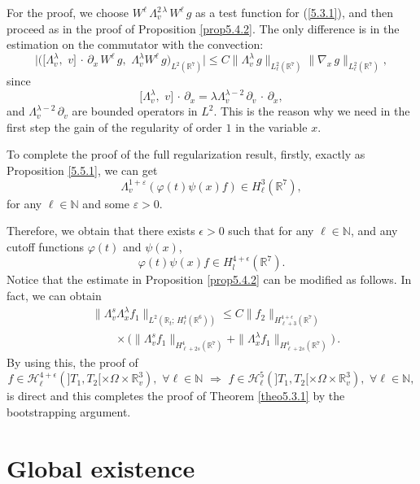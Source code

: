 \documentclass{amsart}[12pt, article]
\begin{document}
For the proof, we choose $W^{\ell}\,\Lambda^{2 \, \lambda}_v \, W^{\ell}\,g $ as a
test function for (\ref{5.3.1}), and then proceed as in the proof of Proposition \ref{prop5.4.2}. The only difference is in the
estimation on the  commutator with the convection:
$$
\Big|\Big( \big[\Lambda^{\lambda}_v, \,\, v\big]\,\cdot\,\partial_x
\, W^\ell\,g ,\,\,  \Lambda^{\lambda}_v W^\ell\,g\Big)_{L^2({{{\mathbb R}}}^7)}
\Big| \leq C
\|\Lambda^{\lambda}_{v}\,g\|_{L^2_\ell({{{\mathbb R}}}^7)}\|\nabla_x
\,g\|_{L^2_\ell({{{\mathbb R}}}^7)} ,
$$
since
$$
\big[\Lambda^{\lambda}_v, \,\, v\big]\,\cdot\,\partial_x =\lambda
\Lambda^{\lambda-2}_v \, \partial_v\,\cdot\,\partial_x,
$$
and $\Lambda^{\lambda-2}_v \, \partial_v$ are bounded operators in
$L^2$. This is the reason why we need in the first
step the gain of the regularity of order $1$ in the variable $x$.

To complete the proof of the full
regularization result, firstly, exactly as Proposition \ref{5.5.1}, we can get
\begin{equation*}
\Lambda^{1+\varepsilon}_{v} (\varphi(t)\psi(x) f)\in H^3_\ell
({{{\mathbb R}}}^7),
\end{equation*}
for any $\ell  \in{{\mathbb N}}$ and some $\varepsilon>0$.

Therefore, we obtain that there exists $\epsilon>0$ such
that for any $\ell\in{{\mathbb N}}$, and any cutoff functions $\varphi(t)$ and
$\psi(x)$,
$$
\varphi(t)\psi(x) f\in H^{4+\epsilon}_l({{{\mathbb R}}}^7).
$$
Notice that the estimate in Proposition \ref{prop5.4.2} can be
modified as follows. In fact, we can obtain
\begin{align*}
&\|\Lambda^{s}_v \Lambda^{\lambda}_{x}  f_1 \|_{
L^2({{{\mathbb R}}}_t;\, H^4_\ell  ({{{\mathbb R}}}^6))}\leq C \| f_2 \|_{{H^{4+\epsilon}_{\ell+3}({{{\mathbb R}}}^7)}}\\
&\qquad\times\Big(\|\Lambda^{s}_v f_1 \|_{
H^4_{\ell+2s}({{{\mathbb R}}}^7)}+\|\Lambda^{\lambda}_{x}  f_1
\|_{ H^4_{\ell+2s}({{{\mathbb R}}}^7)}\Big)\, .
\end{align*}
By using this, the proof of
$$
f\in {{\mathcal H}}^{4+\epsilon}_\ell(]T_1,
T_2[\times\Omega\times{{{\mathbb R}}}^3_v),\,\,\forall
\ell\in{{\mathbb N}}\,\,\Longrightarrow \,\, f\in {{\mathcal H}}^{5}_\ell(]T_1,
T_2[\times\Omega\times{{{\mathbb R}}}^3_v),\,\,\forall \ell\in{{\mathbb N}},
$$
 is direct and this completes  the proof of Theorem
\ref{theo5.3.1} by the bootstrapping argument.

\section{Global existence}\label{section7}
\smallbreak
\end{document}

